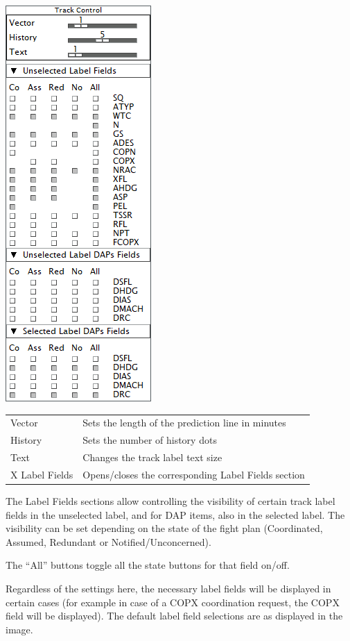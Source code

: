 \documentclass[11pt,a4paper]{memoir}
\begin{document}
\includegraphics{img/trackctl.png}

\begin{tabular}{l l}
    Vector          & Sets the length of the prediction line in minutes\\
    History         & Sets the number of history dots\\
    Text            & Changes the track label text size\\
    X Label Fields  & Opens/closes the corresponding Label Fields section\\
\end{tabular}

The Label Fields sections allow controlling the visibility of certain track label fields in the unselected label, and for DAP items, also in the selected label. The visibility can be set depending on the state of the fight plan (Coordinated, Assumed, Redundant or Notified/Unconcerned).

The “All” buttons toggle all the state buttons for that field on/off.

Regardless of the settings here, the necessary label fields will be displayed in certain cases (for example in case of a COPX coordination request, the COPX field will be displayed). The default label field selections are as displayed in the image.
\end{document}
